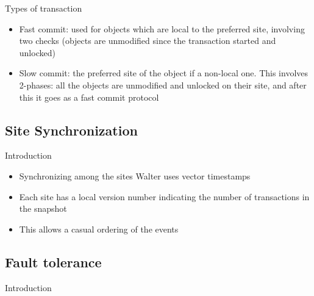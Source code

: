 \documentclass{beamer}
\begin{document}
		\begin{frame}{Types of transaction}
		
		\begin{itemize}
		
		\item Fast commit: used for objects which are local to the preferred site, involving two checks (objects are unmodified since the transaction started and unlocked)
		
		\item Slow commit: the preferred site of the object if a non-local one. This involves 2-phases: all the objects are unmodified and unlocked on their site, and after this it goes as a fast commit protocol		
		
		\end{itemize}

		\end{frame}
 	
	\subsection{Site Synchronization}
	 	
	 	
		\begin{frame}{Introduction}
				
		\begin{itemize}
		
		\item Synchronizing among the sites Walter uses vector timestamps
		\item Each site has a local version number indicating the number of transactions in the snapshot
		\item This allows a casual ordering of the events
		
		\end{itemize}
		
		\end{frame}	 	
 	
	\subsection{Fault tolerance}	
	 	
 	
		\begin{frame}{Introduction}
				

		\end{frame}	 	 	
 	
\end{document}
